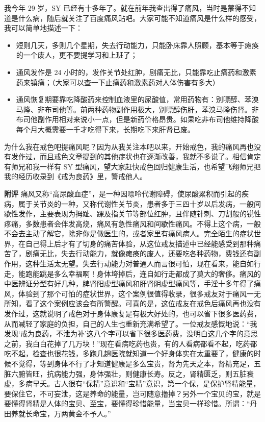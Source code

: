 \begin{case}
    我今年 29 岁，SY 已经有十多年了。就在前年我查出得了痛风，当时是蒙得不知道是什么病，随后就关注了百度痛风贴吧。大家可能不知道痛风是什么样的感受，我可以简单地描述一下：

    \begin{itemize}
        \item 短则几天，多则几个星期，失去行动能力，只能卧床靠人照顾，基本等于瘫痪的一个废人，更不要提学习和上班了；
        \item 通风发作是 24 小时的，发作关节处红肿，剧痛无比，只能靠吃止痛药和激素药来镇痛；（大家可以查一下止痛药和激素药对人体伤害有多大）
        \item 通风恢复期要靠吃降酸药来控制血液里的尿酸值，常用药物有：别嘌醇、苯溴马隆、非布司他等。前两种药物副作用极大，别嘌醇伤肝，苯溴马隆伤肾。非布司他副作用相对来说小一点，但是新药价格昂贵。如果吃非布司他维持降酸每个月大概需要一千才吃得下来，长期吃下来肝肾已废。
    \end{itemize} 为什么我在戒色吧提痛风呢？因为从我关注本吧以来，开始戒色，我的痛风再也没有发作过，而且戒色文章提到的其他症状也在逐渐改善，我就不多说了。相信肯定有师兄和我一样有 SY 型痛风，望大家赶快戒色回归健康生活，也希望飞翔师兄把我的经历收录到《戒为良药》里，警戒他人。

    \textbf{附评} 痛风又称“高尿酸血症”，是一种因嘌呤代谢障碍，使尿酸累积而引起的疾病，属于关节炎的一种，又称代谢性关节炎，患者多于三四十岁以后发病，一般间歇性发作，主要表现为拇趾、踝及指关节等部位红肿，且伴随针刺、刀割般的锐性疼痛，多数患者会伴发高烧，痛风有急性痛风和间歇性痛风。不得上这个病，一般不会去主动了解它，除非你是做医生的，或者家里有痛风病人。完全陌生的症状世界，在自己得上后才有了切身的痛苦体验，从这位戒友描述中已经能感受到那种痛苦了，剧痛无比，失去行动能力，就像瘫痪的废人，还要吃各种药物，费钱还有副作用，这种生活太无望。失去行动能力对普通人而言很可怕，现在看来，能自如行走，能跑能跳是多么幸福啊！身体垮掉后，连自如行走都成了莫大的奢侈。痛风的中医辨证分型有好几种，脾肾阳虚型痛风和肝肾阴虚型痛风等，手淫十多年得了痛风，体验到了那个可怕的症状世界，这个案例很值得收录，很多戒友对于痛风一无所知，看了这个案例应该会有所警醒。可喜的是，这位戒友在戒色后痛风再也没有发作过，这就说明了戒色对于身体康复是有极大好处的，也可以省下很多医药费，从而减轻了家庭的负担，自己的人生也重新充满希望了。一位戒友感慨地说：“我发现‘戒为良药，不泄为补’这八个字可以省下很多医药费，没明白这几个字的意思之前，我白白花掉了几万块！”现在看病吃药也贵，有的人看病都看不起，吃药都吃不起，检查也很花钱，多跑几趟医院就知道一个好身体实在太重要了，健康的时候不觉得，等到身体不行了才知道健康是多么宝贵，肾为先天之本，肾精充足，五脏六腑皆旺，抗病能力强，身体强壮，则健康长寿。反之，肾精匮乏，则五脏衰虚，多病早夭。古人很有“保精”意识和“宝精”意识，第一个保，是保护肾精能量，要保住它，不可妄泄，这是养命的能量，岂可随意撸掉？另外一个宝贝的宝，就是要懂得肾精是人体的宝贝、至宝，要懂得珍惜能量，当宝贝一样珍惜。所谓：“丹田养就长命宝，万两黄金不予人。”
\end{case}

